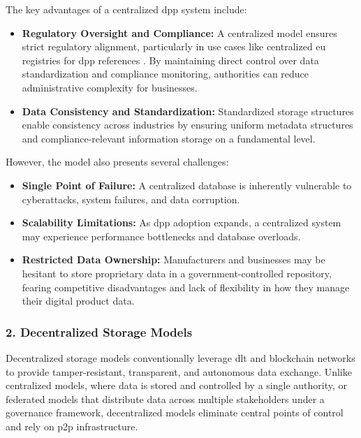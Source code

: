 The key advantages of a centralized \ac{dpp} system include:

\begin{itemize}[itemsep=0.5\baselineskip]
    \item \textbf{Regulatory Oversight and Compliance:} A centralized model ensures strict regulatory alignment, particularly in use cases like centralized \ac{eu} registries for \ac{dpp} references \autocite{EuropeanParliamentandCouncil.2024}. By maintaining direct control over data standardization and compliance monitoring, authorities can reduce administrative complexity for businesses. \autocite{Jansen.2023}
    \item \textbf{Data Consistency and Standardization:} Standardized storage structures enable consistency across industries by ensuring uniform metadata structures and compliance-relevant information storage on a fundamental level. \autocite{Ducuing.2023}
\end{itemize}

However, the model also presents several challenges:

\begin{itemize}[itemsep=0.5\baselineskip]
    \item \textbf{Single Point of Failure:} A centralized database is inherently vulnerable to cyberattacks, system failures, and data corruption. \autocite{Garcia.2024}
    \item \textbf{Scalability Limitations:} As \ac{dpp} adoption expands, a centralized system may experience performance bottlenecks and database overloads. \autocite{Hulea.2024}
    \item \textbf{Restricted Data Ownership:} Manufacturers and businesses may be hesitant to store proprietary data in a government-controlled repository, fearing competitive disadvantages and lack of flexibility in how they manage their digital product data. \autocite{Pietron.2023}
\end{itemize}

\subsubsection*{2. Decentralized Storage Models}
Decentralized storage models conventionally leverage \ac{dlt} and blockchain networks to provide tamper-resistant, transparent, and autonomous data exchange. Unlike centralized models, where data is stored and controlled by a single authority, or federated models that distribute data across multiple stakeholders under a governance framework, decentralized models eliminate central points of control and rely on \ac{p2p} infrastructure. \autocite{Nowacki.2023}

